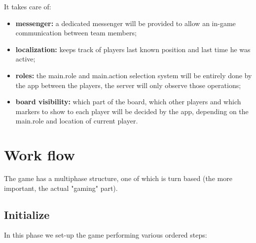				It takes care of:
				\begin{itemize}
					\item \textbf{messenger:} a dedicated messenger will be provided to allow an in-game communication between team members;
					\item \textbf{localization:} keeps track of players last known position and last time he was active;
					\item \textbf{roles:} the main.role and main.action selection system will be entirely done by the app between the players, the server will only observe those operations;
					\item \textbf{board visibility:} which part of the board, which other players and which markers to show to each player will be decided by the app, depending on the main.role and location of current player.
				\end{itemize}
			
	\section{Work flow}
		
		The game has a multiphase structure, one of which is turn based (the more important, the actual "gaming" part).
	
		\subsection{Initialize}
		
			In this phase we set-up the game performing various ordered steps:
			
